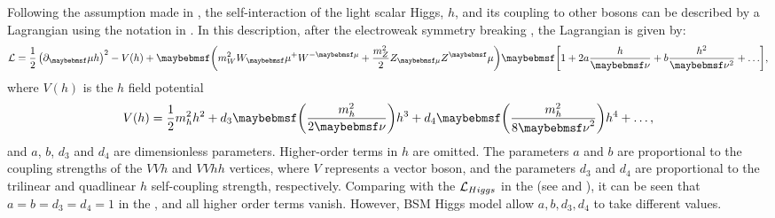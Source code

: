 Following the assumption made in  \cite{Contino:2010mh,Contino:2013gna}, the self-interaction of the light scalar Higgs, $h$, and its coupling to other \SM bosons can be described by a Lagrangian using the notation in  \cite{Contino:2013gna}. In this description, after the electroweak symmetry breaking , the  Lagrangian is given by:
\begin{equation}
\Lagr =\frac{1}{2}\left(\partial_\mu{h}\right)^2  - V(h) + \parenths{m_W^2{W}_\mu^+{W}^{-\mu} + \frac{m_Z^2}{2}Z_{\mu}Z^\mu}\sqbracs{1 + 2a\frac{h}{\nu} + b \frac{h^2}{\nu^2} + \hdots},
\end{equation}
where $V(h)$ is the $h$ field potential
\begin{equation}
V(h) = \frac{1}{2}m_h^2h^2 + d_3\parenths{\frac{m_h^2}{2\nu}}h^3 + d_4\parenths{\frac{m_h^2}{8{\nu}^2}}h^4 + \hdots ,
\end{equation}
and $a$, $b$, $d_3$ and $d_4$ are  dimensionless parameters. Higher-order terms in $h$ are omitted. The parameters $a$ and $b$ are proportional to the coupling strengths of the $VVh$ and $VVhh$ vertices, where $V$ represents a vector boson, and the parameters $d_3$ and $d_4$ are proportional to the trilinear and quadlinear $h$ self-coupling strength, respectively. Comparing with the  $\operatorname{\mathcal{L}}_{Higgs} $ in the \SM (see  and ),  it can be seen that $a=b=d_3=d_4=1$ in the \SM, and all higher order terms vanish. However, BSM Higgs model allow $a,b,d_3,d_4$ to take different values.

